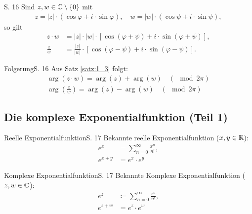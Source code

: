 \begin{satz}{S. 16}
\label{satz:1_3}
  Sind $z, w \in \mathbb{C}\setminus\{0\}$ mit
  \begin{align}
    z = |z| \cdot \left( \cos\varphi + i \cdot \sin\varphi \right), \quad w = |w| \cdot \left( \cos\psi + i \cdot \sin\psi \right),
  \end{align}
  so gilt
  \begin{align}
    z \cdot w &= |z| \cdot |w| \cdot \left[ \cos(\varphi + \psi) + i \cdot \sin(\varphi + \psi) \right],\\
    \frac{z}{w} &= \frac{|z|}{|w|} \cdot \left[ \cos(\varphi - \psi) + i \cdot \sin(\varphi - \psi) \right] .
  \end{align}
\end{satz}

\begin{bemerkung}{Folgerung}{S. 16}
  Aus Satz \ref{satz:1_3} folgt:
  \begin{align}
    \operatorname{arg}(z \cdot w) = \operatorname{arg}(z) + \operatorname{arg}(w) \quad (\mod 2 \pi)\\
    \operatorname{arg}\left(\frac{z}{w}\right) = \operatorname{arg}(z) - \operatorname{arg}(w) \quad (\mod 2 \pi)
  \end{align}
\end{bemerkung}



\subsection{Die komplexe Exponentialfunktion (Teil 1)}

\begin{bemerkung}{Reelle Exponentialfunktion}{S. 17}
  Bekannte reelle Exponentialfunktion ($x, y \in \mathbb{R}$):
  \begin{align}
    e^x &= \sum_{n=0}^\infty \frac{x^n}{n!},\\
    e^{x+y} &= e^x \cdot e^y
  \end{align}
\end{bemerkung}

\begin{bemerkung}{Komplexe Exponentialfunktion}{S. 17}
  Bekannte Komplexe Exponentialfunktion ($z, w \in \mathbb{C}$):
  \begin{align}
    e^z &\coloneqq \sum_{n=0}^\infty \frac{z^n}{n!},\\
    e^{z+w} &= e^z \cdot e^w \label{eq:potenz_komplex}
  \end{align}
\end{bemerkung}

